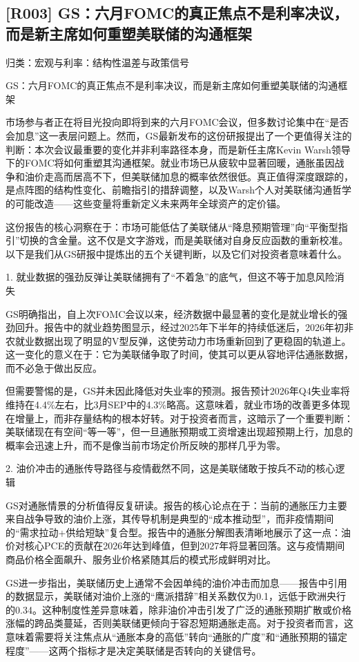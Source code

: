 \documentclass[11pt]{ctexart}
\begin{document}
\subsection{[R003] GS：六月FOMC的真正焦点不是利率决议，而是新主席如何重塑美联储的沟通框架}
{\small\color{refgray}归类：宏观与利率：结构性温差与政策信号}

GS：六月FOMC的真正焦点不是利率决议，而是新主席如何重塑美联储的沟通框架

市场参与者正在将目光投向即将到来的六月FOMC会议，但多数讨论集中在“是否会加息”这一表层问题上。然而，GS最新发布的这份研报提出了一个更值得关注的判断：本次会议最重要的变化并非利率路径本身，而是新任主席Kevin Warsh领导下的FOMC将如何重塑其沟通框架。就业市场已从疲软中显著回暖，通胀虽因战争和油价走高而居高不下，但美联储加息的概率依然很低。真正值得深度跟踪的，是点阵图的结构性变化、前瞻指引的措辞调整，以及Warsh个人对美联储沟通哲学的可能改造——这些变量将重新定义未来两年全球资产的定价锚。

这份报告的核心洞察在于：市场可能低估了美联储从“降息预期管理”向“平衡型指引”切换的含金量。这不仅是文字游戏，而是美联储对自身反应函数的重新校准。以下是我们从GS研报中提炼出的五个关键判断，以及它们对投资者意味着什么。

1. 就业数据的强劲反弹让美联储拥有了“不着急”的底气，但这不等于加息风险消失

GS明确指出，自上次FOMC会议以来，经济数据中最显著的变化是就业增长的强劲回升。报告中的就业趋势图显示，经过2025年下半年的持续低迷后，2026年初非农就业数据出现了明显的V型反弹，这使劳动力市场重新回到了更稳固的轨道上。这一变化的意义在于：它为美联储争取了时间，使其可以更从容地评估通胀数据，而不必急于做出反应。

但需要警惕的是，GS并未因此降低对失业率的预测。报告预计2026年Q4失业率将维持在4.4\%左右，比3月SEP中的4.3\%略高。这意味着，就业市场的改善更多体现在增量上，而非存量结构的根本好转。对于投资者而言，这暗示了一个重要判断：美联储现在有空间“等一等”，但一旦通胀预期或工资增速出现超预期上行，加息的概率会迅速上升，而不是像当前市场定价所反映的那样几乎为零。

2. 油价冲击的通胀传导路径与疫情截然不同，这是美联储敢于按兵不动的核心逻辑

GS对通胀情景的分析值得反复研读。报告的核心论点在于：当前的通胀压力主要来自战争导致的油价上涨，其传导机制是典型的“成本推动型”，而非疫情期间的“需求拉动+供给短缺”复合型。报告中的通胀分解图表清晰地展示了这一点：油价对核心PCE的贡献在2026年达到峰值，但到2027年将显著回落。这与疫情期间商品价格全面飙升、服务业价格紧随其后的模式形成鲜明对比。

GS进一步指出，美联储历史上通常不会因单纯的油价冲击而加息——报告中引用的数据显示，美联储对油价上涨的“鹰派措辞”相关系数仅为0.1，远低于欧洲央行的0.34。这种制度性差异意味着，除非油价冲击引发了广泛的通胀预期扩散或价格涨幅的跨品类蔓延，否则美联储更倾向于容忍短期通胀走高。对于投资者而言，这意味着需要将关注焦点从“通胀本身的高低”转向“通胀的广度”和“通胀预期的锚定程度”——这两个指标才是决定美联储是否转向的关键信号。
\end{document}

